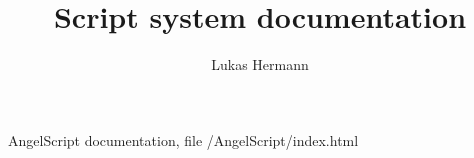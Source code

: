 \documentclass[12pt, a4paper]{article}
\begin{document}
\title{Script system documentation}
\author{Lukas Hermann}
\maketitle

\tableofcontents

\newpage



\begin{thebibliography}{9}
AngelScript documentation, file /AngelScript/index.html
\end{thebibliography}
\end{document}
